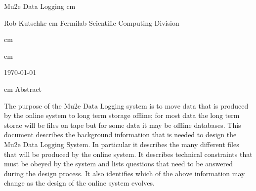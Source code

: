 %
\begin{center}
  {\Huge Mu2e Data Logging}
   cm

  Rob Kutschke
 cm
Fermilab Scientific Computing Division

 cm


%

%

 cm

\today

 cm
Abstract
\end{center}
\medskip

The purpose of the Mu2e Data Logging system is to move data
that is produced by the online system to long term storage offline;
for most data the long term storae will be files on tape
but for some data it may be offline databases.
This document describes the background information
that is needed to design the Mu2e Data Logging System.
In particular it describes
the many different files that will be produced by the online system.
It describes technical constraints that must be obeyed by the system
and lists questions that need to be answered during the design process.
It also identifies which of the above information may change as the
design of the online system evolves.
\cleardoublepage

